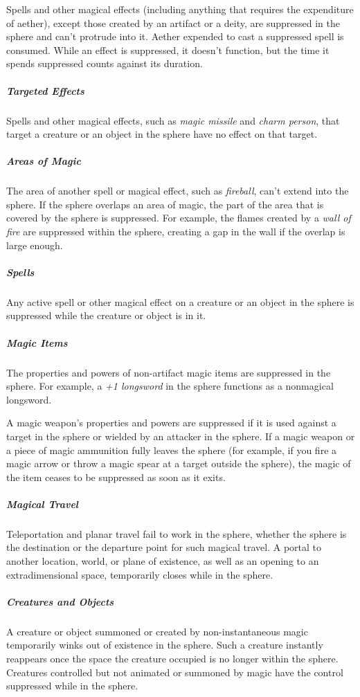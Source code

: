 Spells and other magical effects (including anything that requires the expenditure of aether), except those created by an artifact or a deity, are suppressed in the sphere and can’t protrude into it. Aether expended to cast a suppressed spell is consumed. While an effect is suppressed, it doesn’t function, but the time it spends suppressed counts against its duration.

\subparagraph*{Targeted Effects} Spells and other magical effects, such as \textit{magic missile} and \textit{charm person}, that target a creature or an object in the sphere have no effect on that target.

\subparagraph*{Areas of Magic} The area of another spell or magical effect, such as \textit{fireball}, can’t extend into the sphere. If the sphere overlaps an area of magic, the part of the area that is covered by the sphere is suppressed. For example, the flames created by a \textit{wall of fire} are suppressed within the sphere, creating a gap in the wall if the overlap is large enough.

\subparagraph*{Spells} Any active spell or other magical effect on a creature or an object in the sphere is suppressed while the creature or object is in it.

\subparagraph*{Magic Items} The properties and powers of non-artifact magic items are suppressed in the sphere. For example, a \textit{+1 longsword} in the sphere functions as a nonmagical longsword.

A magic weapon’s properties and powers are suppressed if it is used against a target in the sphere or wielded by an attacker in the sphere. If a magic weapon or a piece of magic ammunition fully leaves the sphere (for example, if you fire a magic arrow or throw a magic spear at a target outside the sphere), the magic of the item ceases to be suppressed as soon as it exits.

\subparagraph*{Magical Travel} Teleportation and planar travel fail to work in the sphere, whether the sphere is the destination or the departure point for such magical travel. A portal to another location, world, or plane of existence, as well as an opening to an extradimensional space, temporarily closes while in the sphere.

\subparagraph*{Creatures and Objects} A creature or object summoned or created by non-instantaneous magic temporarily winks out of existence in the sphere. Such a creature instantly reappears once the space the creature occupied is no longer within the sphere. Creatures controlled but not animated or summoned by magic have the control suppressed while in the sphere.

